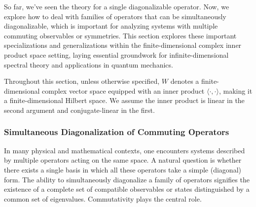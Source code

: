 So far, we've seen the theory for a single diagonalizable operator. Now, we explore how to deal with families of operators that can be simultaneously diagonalizable, which is important for analyzing systems with multiple commuting observables or symmetries. This section explores these important specializations and generalizations within the finite-dimensional complex inner product space setting, laying essential groundwork for infinite-dimensional spectral theory and applications in quantum mechanics.

Throughout this section, unless otherwise specified, $W$ denotes a finite-dimensional complex vector space equipped with an inner product $\langle \cdot, \cdot \rangle$, making it a finite-dimensional Hilbert space. We assume the inner product is linear in the second argument and conjugate-linear in the first.

\subsubsection{Simultaneous Diagonalization of Commuting Operators}
\label{subsec:simultaneous_diag}

In many physical and mathematical contexts, one encounters systems described by multiple operators acting on the same space. A natural question is whether there exists a single basis in which all these operators take a simple (diagonal) form. The ability to simultaneously diagonalize a family of operators signifies the existence of a complete set of compatible observables or states distinguished by a common set of eigenvalues. Commutativity plays the central role.

